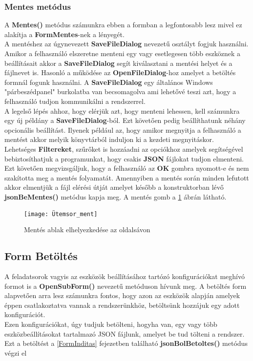 \documentclass[tocnopagenum]{thesis-ekf}
\theoremstyle{definition}
\theoremstyle{remark}
\begin{document}
	\subsubsection{Mentes metódus}
	A \textbf{Mentes()} metódus számunkra ebben a formban a legfontosabb lesz mivel ez alakítja a \textbf{FormMentes}-nek a lényegét. 
	\\
	A mentéshez az úgynevezett \textbf{SaveFileDialog} nevezetű osztályt fogjuk használni. 
	\\
	Amikor a felhasználó elszeretne menteni egy vagy esetlegesen több eszköznek a beállításait akkor a \textbf{SaveFileDialog} segít kiválasztani a mentési helyet és a fájlnevet is. Hasonló a működése az \textbf{OpenFileDialog}-hoz amelyet a betöltés formnál fogunk használni. A \textbf{SaveFileDialog} egy általános Windows "párbeszédpanel" burkolatba van becsomagolva ami lehetővé teszi azt, hogy a felhasználó tudjon kommunikálni a rendszerrel.
	\\
	A legelső lépés ahhoz, hogy elérjük azt, hogy menteni lehessen, kell számunkra egy új példány a \textbf{SaveFileDialog}-ból. Ezt követően pedig beállíthatunk néhány opcionális beállítást. Ilyenek például az, hogy amikor megnyitja a felhasználó a mentést akkor melyik könyvtárból induljon ki a kezdeti megnyitáskor. 
	\\
	Lehetséges \textbf{Filtereket}, szűrőket is hozzáadni az opciókhoz amelyek segítségével bebiztosíthatjuk a programunkat, hogy csakis \textbf{JSON} fájlokat tudjon elmenteni.
	\\
	Ezt követően megvizsgáljuk, hogy a felhasználó az \textbf{OK} gombra nyomott-e és nem szakította meg a mentés folyamatát. Amennyiben a mentés során minden lefutott akkor elmentjük a fájl elérési útját amelyet később a konstruktorban lévő \textbf{jsonBeMentes()} metódus kapja meg.
	A mentés gomb a \ref{fig:mentesgomb} ábrán látható.
	\begin{figure}[H]	
		\centering
		\texttt{[image: Ütemsor\_ment]}
		\caption[Mentés ablak elhelyezkedése az oldalsávon]{Mentés ablak elhelyezkedése az oldalsávon}
		\label{fig:mentesgomb}
	\end{figure}
	\subsection{Form Betöltés}
	\label{Form Betoltes}
	A feladatsorok vagyis az eszközök beállításához tartózó konfigurációkat meghívó formot is a \textbf{OpenSubForm()} nevezetű metóduson hívunk meg. A betöltés form alapvetően arra lesz számunkra fontos, hogy azon az eszközök alapján amelyek éppen csatlakoztatva vannak a rendszerünkhöz, betöltsünk hozzájuk egy adott konfigurációt.
	\\
	Ezen konfigurációkat, úgy tudjuk betölteni, hogyha van, egy vagy több eszközbeállításokat tartalmazó JSON fájlunk, amelyet be tud tölteni a rendszer. Ezt a betöltést a \ref{FormInditas} fejezetben található \textbf{jsonBolBetoltes()} metódus végzi el
\end{document}

